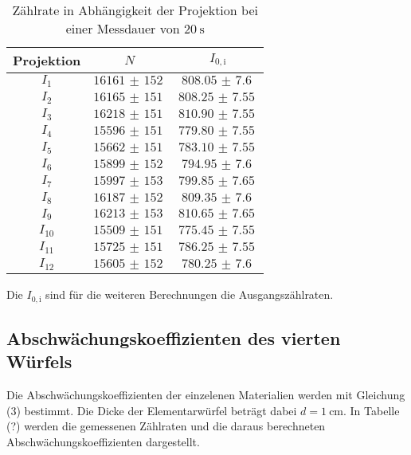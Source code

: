 \begin{table}[H]
  \centering
  \caption{Zählrate in Abhängigkeit der Projektion bei einer Messdauer von $\SI{20}{\second}$ }
  \label{tab:w1}
  \begin{tabular}{c c c}
    \toprule
    Projektion & $N$ & $I_{0,\mathrm{i}}$   \\
    \midrule
        $I_1$    & $\SI{16161(152)}{}$ & $\SI{808.05(760)}{}$    \\
        $I_2$    & $\SI{16165(151)}{}$ & $\SI{808.25(755)}{}$    \\
        $I_3$    & $\SI{16218(151)}{}$ & $\SI{810.90(755)}{}$    \\
        $I_4$    & $\SI{15596(151)}{}$ & $\SI{779.80(755)}{}$    \\
        $I_5$    & $\SI{15662(151)}{}$ & $\SI{783.10(755)}{}$    \\
        $I_6$    & $\SI{15899(152)}{}$ & $\SI{794.95(760)}{}$    \\
        $I_7$    & $\SI{15997(153)}{}$ & $\SI{799.85(765)}{}$    \\
        $I_8$    & $\SI{16187(152)}{}$ & $\SI{809.35(760)}{}$    \\
        $I_9$    & $\SI{16213(153)}{}$ & $\SI{810.65(765)}{}$    \\
        $I_{10}$ & $\SI{15509(151)}{}$ & $\SI{775.45(755)}{}$   \\
        $I_{11}$ & $\SI{15725(151)}{}$ & $\SI{786.25(755)}{}$    \\
        $I_{12}$ & $\SI{15605(152)}{}$ & $\SI{780.25(760)}{}$    \\
    \bottomrule
  \end{tabular}
\end{table}

Die $I_{0,\mathrm{i}}$ sind für die weiteren Berechnungen die Ausgangszählraten.




\subsection{Abschwächungskoeffizienten des vierten Würfels}
Die Abschwächungskoeffizienten der einzelenen Materialien werden mit Gleichung (3) bestimmt. Die Dicke
der Elementarwürfel beträgt dabei $d=\SI{1}{\centi\meter}$. In Tabelle (?) werden die gemessenen Zählraten und
die daraus berechneten Abschwächungskoeffizienten dargestellt.

